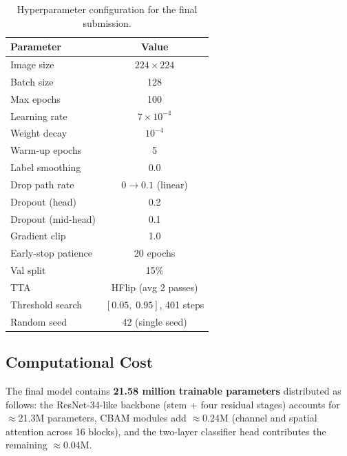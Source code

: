 \documentclass{article}
\theoremstyle{plain}
\theoremstyle{definition}
\theoremstyle{remark}
\begin{document}
\begin{table}[t]
\caption{Hyperparameter configuration for the final submission.}
\label{tab:hparams}
\vskip 0.15in
\begin{center}
\begin{small}
\begin{sc}
\begin{tabular}{lc}
\toprule
Parameter & Value \\
\midrule
Image size           & $224 \times 224$ \\
Batch size           & 128 \\
Max epochs           & 100 \\
Learning rate        & $7 \times 10^{-4}$ \\
Weight decay         & $10^{-4}$ \\
Warm-up epochs       & 5 \\
Label smoothing      & 0.0 \\
Drop path rate       & $0 \to 0.1$ (linear) \\
Dropout (head)       & 0.2 \\
Dropout (mid-head)   & 0.1 \\
Gradient clip        & 1.0 \\
Early-stop patience  & 20 epochs \\
Val split            & 15\% \\
TTA                  & HFlip (avg 2 passes) \\
Threshold search     & $[0.05,\;0.95]$, 401 steps \\
Random seed          & 42 (single seed) \\
\bottomrule
\end{tabular}
\end{sc}
\end{small}
\end{center}
\vskip -0.1in
\end{table}

\subsection{Computational Cost}

The final model contains \textbf{21.58 million trainable parameters}
distributed as follows: the ResNet-34-like backbone (stem + four
residual stages) accounts for $\approx$21.3M parameters, CBAM modules
add $\approx$0.24M (channel and spatial attention across 16 blocks),
and the two-layer classifier head contributes the remaining $\approx$0.04M.
\end{document}
